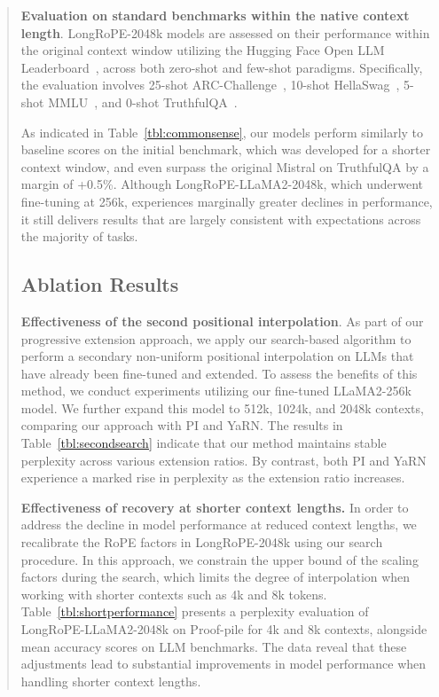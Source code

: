 \begin{abstract}
\textbf{Evaluation on standard benchmarks within the native context length}. LongRoPE-2048k models are assessed on their performance within the original context window utilizing the Hugging Face Open LLM Leaderboard~\cite{huggingfaceboard}, across both zero-shot and few-shot paradigms. Specifically, the evaluation involves 25-shot ARC-Challenge~\cite{allenai:arc}, 10-shot HellaSwag~\cite{zellers2019hellaswag}, 5-shot MMLU~\cite{mmlu}, and 0-shot TruthfulQA~\cite{lin2021truthfulqa}.

As indicated in Table~\ref{tbl:commonsense}, our models perform similarly to baseline scores on the initial benchmark, which was developed for a shorter context window, and even surpass the original Mistral on TruthfulQA by a margin of +0.5\%. Although LongRoPE-LLaMA2-2048k, which underwent fine-tuning at 256k, experiences marginally greater declines in performance, it still delivers results that are largely consistent with expectations across the majority of tasks.

\subsection{Ablation Results}

\textbf{Effectiveness of the second positional interpolation}. As part of our progressive extension approach, we apply our search-based algorithm to perform a secondary non-uniform positional interpolation on LLMs that have already been fine-tuned and extended. To assess the benefits of this method, we conduct experiments utilizing our fine-tuned LLaMA2-256k model. We further expand this model to 512k, 1024k, and 2048k contexts, comparing our approach with PI and YaRN. The results in Table~\ref{tbl:secondsearch} indicate that our method maintains stable perplexity across various extension ratios. By contrast, both PI and YaRN experience a marked rise in perplexity as the extension ratio increases.

\textbf{Effectiveness of recovery at shorter context lengths.} In order to address the decline in model performance at reduced context lengths, we recalibrate the RoPE factors in LongRoPE-2048k using our search procedure. In this approach, we constrain the upper bound of the scaling factors during the search, which limits the degree of interpolation when working with shorter contexts such as 4k and 8k tokens. Table~\ref{tbl:shortperformance} presents a perplexity evaluation of LongRoPE-LLaMA2-2048k on Proof-pile for 4k and 8k contexts, alongside mean accuracy scores on LLM benchmarks. The data reveal that these adjustments lead to substantial improvements in model performance when handling shorter context lengths.


\end{abstract}
